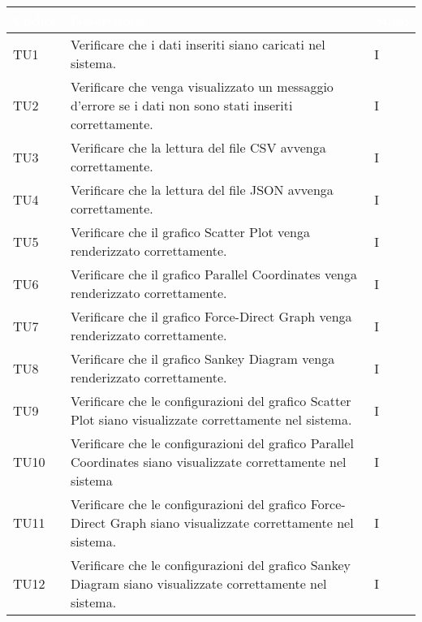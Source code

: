     \begin{center}
        \renewcommand\arraystretch{1.5}
        \centering
        \begin{longtable}{|p{1.5cm}|p{11cm}|p{1cm}|}
        \hline
        \rowcolor[HTML]{036400}
        \textcolor{white}{\textbf{Codice}} & \textcolor{white}{\textbf{Descrizione}} & \textcolor{white}{\textbf{Stato}} \\ \hline
            \rowcolor[HTML]{EFEFEF}
            TU1 & Verificare che i dati inseriti siano caricati nel sistema. & I\\ \hline
            \rowcolor[HTML]{C0C0C0}
            TU2 & Verificare che venga visualizzato un messaggio d'errore se i dati non sono stati inseriti correttamente. & I\\ \hline
            \rowcolor[HTML]{EFEFEF}
            TU3 & Verificare che la lettura del file CSV avvenga correttamente. & I\\ \hline
            \rowcolor[HTML]{C0C0C0}
            TU4 & Verificare che la lettura del file JSON avvenga correttamente. & I\\ \hline
            \rowcolor[HTML]{C0C0C0}
            TU5 & Verificare che il grafico Scatter Plot venga renderizzato correttamente. & I\\ \hline
            \rowcolor[HTML]{EFEFEF}
            TU6 & Verificare che il grafico Parallel Coordinates venga renderizzato correttamente. & I\\ \hline
            \rowcolor[HTML]{C0C0C0}
            TU7 & Verificare che il grafico Force-Direct Graph venga renderizzato correttamente. & I\\ \hline
            \rowcolor[HTML]{EFEFEF}
            TU8 & Verificare che il grafico Sankey Diagram venga renderizzato correttamente. & I\\ \hline
            \rowcolor[HTML]{C0C0C0}
            TU9 & Verificare che le configurazioni del grafico Scatter Plot siano visualizzate correttamente nel sistema. & I\\ \hline
            \rowcolor[HTML]{EFEFEF}
            TU10 & Verificare che le configurazioni del grafico Parallel Coordinates siano visualizzate correttamente nel sistema & I\\ \hline
            \rowcolor[HTML]{C0C0C0}
            TU11 & Verificare che le configurazioni del grafico Force-Direct Graph siano visualizzate correttamente nel sistema. & I\\ \hline
            \rowcolor[HTML]{EFEFEF}
            TU12 & Verificare che le configurazioni del grafico Sankey Diagram siano visualizzate correttamente nel sistema. & I\\ \hline

\end{longtable}
\end{center}
